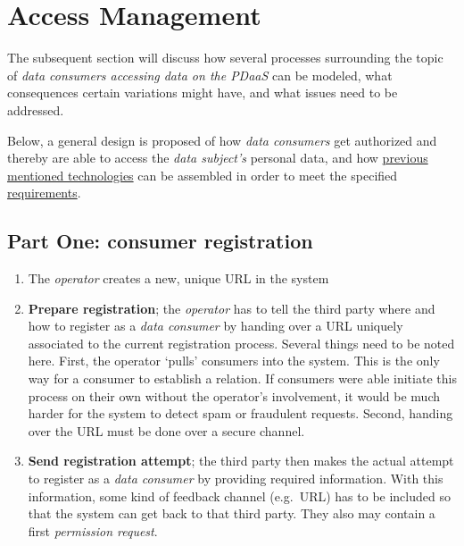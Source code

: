 \documentclass[12pt,english,a4paper,titlepage,cleardoublepage=empty,dottedtoc]{report}
\begin{document}
\section{Access Management}\label{access-management}

The subsequent section will discuss how several processes surrounding
the topic of \emph{data consumers accessing data on the PDaaS} can be
modeled, what consequences certain variations might have, and what
issues need to be addressed.

Below, a general design is proposed of how \emph{data consumers} get
authorized and thereby are able to access the \emph{data subject's}
personal data, and how
\protect\hyperlink{standards-specifications-and-related-technologies}{previous
mentioned technologies} can be assembled in order to meet the specified
\protect\hyperlink{requirements}{requirements}.

\subsection*{Part One: consumer
registration}\label{part-one-consumer-registration}

\begin{enumerate}
\def\labelenumi{\arabic{enumi})}
\setcounter{enumi}{-1}
\item
  The \emph{operator} creates a new, unique URL in the system
\item
  \textbf{Prepare registration}; the \emph{operator} has to tell the
  third party where and how to register as a \emph{data consumer} by
  handing over a URL uniquely associated to the current registration
  process. Several things need to be noted here. First, the operator
  `pulls' consumers into the system. This is the only way for a consumer
  to establish a relation. If consumers were able initiate this process
  on their own without the operator's involvement, it would be much
  harder for the system to detect spam or fraudulent requests. Second,
  handing over the URL must be done over a secure channel.
\item
  \textbf{Send registration attempt}; the third party then makes the
  actual attempt to register as a \emph{data consumer} by providing
  required information. With this information, some kind of feedback
  channel (e.g.~URL) has to be included so that the system can get back
  to that third party. They also may contain a first \emph{permission
  request}.
\end{enumerate}
\end{document}
